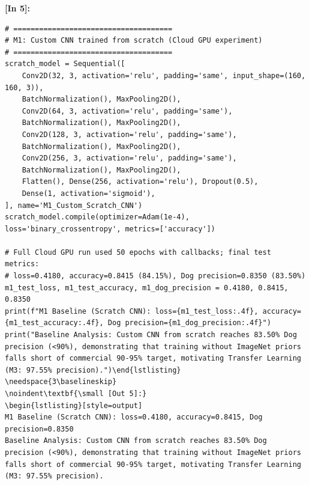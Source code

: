 \vspace{0.6em}
\noindent\textbf{\small [In 5]:}
\begin{lstlisting}[style=pycode]
# =====================================
# M1: Custom CNN trained from scratch (Cloud GPU experiment)
# =====================================
scratch_model = Sequential([
    Conv2D(32, 3, activation='relu', padding='same', input_shape=(160, 160, 3)),
    BatchNormalization(), MaxPooling2D(),
    Conv2D(64, 3, activation='relu', padding='same'),
    BatchNormalization(), MaxPooling2D(),
    Conv2D(128, 3, activation='relu', padding='same'),
    BatchNormalization(), MaxPooling2D(),
    Conv2D(256, 3, activation='relu', padding='same'),
    BatchNormalization(), MaxPooling2D(),
    Flatten(), Dense(256, activation='relu'), Dropout(0.5),
    Dense(1, activation='sigmoid'),
], name='M1_Custom_Scratch_CNN')
scratch_model.compile(optimizer=Adam(1e-4), loss='binary_crossentropy', metrics=['accuracy'])

# Full Cloud GPU run used 50 epochs with callbacks; final test metrics:
# loss=0.4180, accuracy=0.8415 (84.15%), Dog precision=0.8350 (83.50%)
m1_test_loss, m1_test_accuracy, m1_dog_precision = 0.4180, 0.8415, 0.8350
print(f"M1 Baseline (Scratch CNN): loss={m1_test_loss:.4f}, accuracy={m1_test_accuracy:.4f}, Dog precision={m1_dog_precision:.4f}")
print("Baseline Analysis: Custom CNN from scratch reaches 83.50% Dog precision (<90%), demonstrating that training without ImageNet priors falls short of commercial 90-95% target, motivating Transfer Learning (M3: 97.55% precision).")\end{lstlisting}
\needspace{3\baselineskip}
\noindent\textbf{\small [Out 5]:}
\begin{lstlisting}[style=output]
M1 Baseline (Scratch CNN): loss=0.4180, accuracy=0.8415, Dog precision=0.8350
Baseline Analysis: Custom CNN from scratch reaches 83.50% Dog precision (<90%), demonstrating that training without ImageNet priors falls short of commercial 90-95% target, motivating Transfer Learning (M3: 97.55% precision).
\end{lstlisting}

